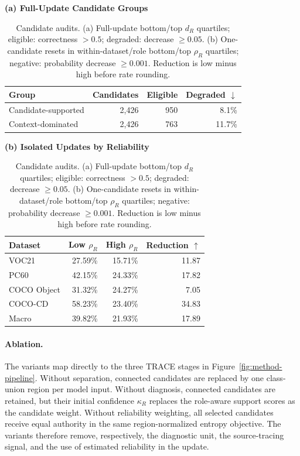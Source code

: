 \documentclass[letterpaper]{article}
\newcommand{\method}{TRACE\xspace}
\begin{document}
	\begin{table}[!b]
		\centering
		{
			\footnotesize
			
			\textbf{(a) Full-Update Candidate Groups}\\[1pt]
			\setlength{\tabcolsep}{3.3pt}
			\begin{tabular}{lrrr}
				\toprule
				Group & Candidates & Eligible & Degraded $\downarrow$ \\
				\midrule
				Candidate-supported & 2,426 & 950 & 8.1\% \\
				Context-dominated & 2,426 & 763 & 11.7\% \\
				\bottomrule
			\end{tabular}
			
			\par\smallskip
			
			\textbf{(b) Isolated Updates by Reliability}\\[1pt]
			\setlength{\tabcolsep}{3.4pt}
			\begin{tabular}{lrrr}
				\toprule
				Dataset & Low $\rho_R$ & High $\rho_R$ & Reduction $\uparrow$ \\
				\midrule
				VOC21 & 27.59\% & 15.71\% & 11.87 \\
				PC60 & 42.15\% & 24.33\% & 17.82 \\
				COCO Object & 31.32\% & 24.27\% & 7.05 \\
				COCO-CD & 58.23\% & 23.40\% & 34.83 \\
				\midrule
				Macro & 39.82\% & 21.93\% & 17.89 \\
				\bottomrule
			\end{tabular}
		}
		\caption{Candidate audits. (a) Full-update bottom/top $d_R$ quartiles; eligible: correctness $>0.5$; degraded: decrease $\geq0.05$. (b) One-candidate resets in within-dataset/role bottom/top $\rho_R$ quartiles; negative: probability decrease $\geq0.001$. Reduction is low minus high before rate rounding.}
		\label{tab:reliability-audit}
	\end{table}
	
	\paragraph{Ablation.}
	The variants map directly to the three \method stages in Figure~\ref{fig:method-pipeline}. Without separation, connected candidates are replaced by one class-union region per model input. Without diagnosis, connected candidates are retained, but their initial confidence $\kappa_R$ replaces the role-aware support scores as the candidate weight. Without reliability weighting, all selected candidates receive equal authority in the same region-normalized entropy objective. The variants therefore remove, respectively, the diagnostic unit, the source-tracing signal, and the use of estimated reliability in the update.
	
\end{document}
